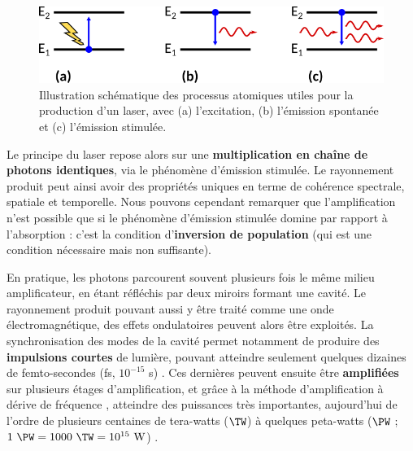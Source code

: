 \begin{refsection}
\begin{figure}[htbp]
    \centering
    \includegraphics[width=\linewidth]{2-laser/emission_stimulee.png}
    \caption{Illustration schématique des processus atomiques utiles pour la production d'un laser, avec (a) l'excitation, (b) l'émission spontanée et (c) l'émission stimulée.}
    \label{fig:2-effets_atomiques}
\end{figure}

Le principe du laser repose alors sur une \textbf{multiplication en chaîne de photons identiques}, via le phénomène d'émission stimulée. Le rayonnement produit peut ainsi avoir des propriétés uniques en terme de cohérence spectrale, spatiale et temporelle. Nous pouvons cependant remarquer que l'amplification n'est possible que si le phénomène d'émission stimulée domine par rapport à l'absorption : c'est la condition d'\textbf{inversion de population} (qui est une condition nécessaire mais non suffisante).

En pratique, les photons parcourent souvent plusieurs fois le même milieu amplificateur, en étant réfléchis par deux miroirs formant une cavité. Le rayonnement produit pouvant aussi y être traité comme une onde électromagnétique, des effets ondulatoires peuvent alors être exploités. La synchronisation des modes de la cavité permet notamment de produire des \textbf{impulsions courtes} de lumière, pouvant atteindre seulement quelques dizaines de femto-secondes (fs, $10^{-15}$ s) \parencite{hennequin_2013}. Ces dernières peuvent ensuite être \textbf{amplifiées} sur plusieurs étages d'amplification, et grâce à la méthode d'amplification à dérive de fréquence \parencite{strickland_1985a}, atteindre des puissances très importantes, aujourd'hui de l'ordre de plusieurs centaines de tera-watts ($\si{\TW}$) à quelques peta-watts ($\si{\PW}$ ; $1 ~ \si{\PW} = 1000 ~ \si{\TW} = 10^{15} ~ \si{W}$) \parencite{danson_2019}.


\end{refsection}
